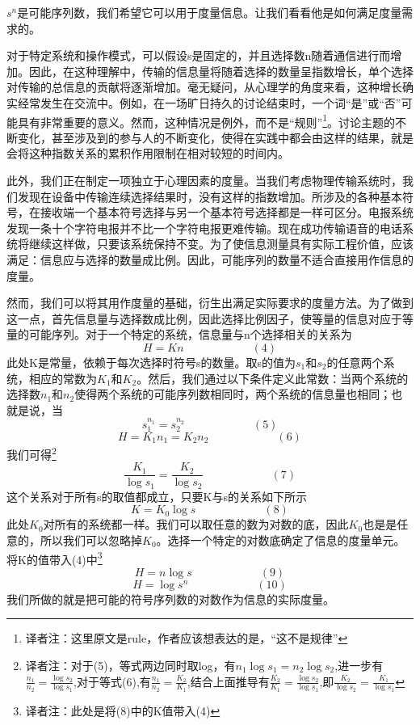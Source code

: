 \documentclass{hfutpaper}
\begin{document}
$s^n$是可能序列数，我们希望它可以用于度量信息。让我们看看他是如何满足度量需求的。


对于特定系统和操作模式，可以假设s是固定的，并且选择数n随着通信进行而增加。因此，在这种理解中，传输的信息量将随着选择的数量呈指数增长，单个选择对传输的总信息的贡献将逐渐增加。毫无疑问，从心理学的角度来看，这种增长确实经常发生在交流中。例如，在一场旷日持久的讨论结束时，一个词“是”或“否”可能具有非常重要的意义。然而，这种情况是例外，而不是“规则”\footnote{译者注：这里原文是rule，作者应该想表达的是，“这不是规律”}。讨论主题的不断变化，甚至涉及到的参与人的不断变化，使得在实践中都会由这样的结果，就是会将这种指数关系的累积作用限制在相对较短的时间内。


此外，我们正在制定一项独立于心理因素的度量。当我们考虑物理传输系统时，我们发现在设备中传输连续选择结果时，没有这样的指数增加。所涉及的各种基本符号，在接收端一个基本符号选择与另一个基本符号选择都是一样可区分。电报系统发现一条十个字符电报并不比一个字符电报更难传输。现在成功传输语音的电话系统将继续这样做，只要该系统保持不变。为了使信息测量具有实际工程价值，应该满足：信息应与选择的数量成比例。因此，可能序列的数量不适合直接用作信息的度量。


然而，我们可以将其用作度量的基础，衍生出满足实际要求的度量方法。为了做到这一点，首先信息量与选择数成比例，因此选择比例因子，使等量的信息对应于等量的可能序列。对于一个特定的系统，信息量与n个选择相关的关系为
\[H=Kn \qquad \qquad \qquad (4)\]
此处K是常量，依赖于每次选择时符号s的数量。取s的值为$s_1$和$s_2$的任意两个系统，相应的常数为$K_1$和$K_2$。然后，我们通过以下条件定义此常数：当两个系统的选择数$n_1$和$n_2$使得两个系统的可能序列数相同时，两个系统的信息量也相同；也就是说，当
\[s_1^{n_1}=s_2^{n_2}\qquad \qquad \qquad (5)\]
\[H=K_1n_1=K_2 n_2 \qquad \qquad \qquad (6)\]
我们可得\footnote{
	译者注：对于(5)，等式两边同时取log，有$n_1\log{s_1} = n_2 \log{s_2}$,进一步有$\frac{n_1}{n_2} =\frac{\log{s_2}}{\log{s_1}}$,对于等式(6),有$\frac{n_1}{n_2} =\frac{K_2}{K_1}$,结合上面推导有$\frac{K_2}{K_1}=\frac{\log{s_2}}{\log{s_1}}$,即$\frac{K_2}{\log{s_2}}=\frac{K_1}{\log{s_1}}$
}
\[\frac{K_1}{\log{s_1}} = \frac{K_2}{\log{s_2}}  \qquad \qquad \qquad (7)  \]
这个关系对于所有s的取值都成立，只要K与s的关系如下所示
\[K=K_0 \log{s} \qquad \qquad \qquad (8) \]
此处$K_0$对所有的系统都一样。我们可以取任意的数为对数的底，因此$K_0$也是是任意的，所以我们可以忽略掉$K_0$。选择一个特定的对数底确定了信息的度量单元。将K的值带入(4)中\footnote{译者注：此处是将(8)中的K值带入(4)}
\[H=n\log{s} \qquad \qquad \qquad (9)  \]
\[H= \log{s^n} \qquad \qquad \qquad (10) \]
我们所做的就是把可能的符号序列数的对数作为信息的实际度量。
\end{document}
